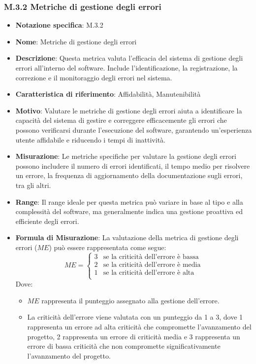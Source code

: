 \subsubsection{M.3.2 Metriche di gestione degli errori}
\begin{itemize}
    \item \textbf{Notazione specifica}: M.3.2
    \item \textbf{Nome}: Metriche di gestione degli errori
    \item \textbf{Descrizione}: Questa metrica valuta l'efficacia del sistema di gestione degli errori all'interno del software. Include l'identificazione, la registrazione, la correzione e il monitoraggio degli errori nel sistema.
    \item \textbf{Caratteristica di riferimento}: Affidabilità, Manutenibilità
    \item \textbf{Motivo}: Valutare le metriche di gestione degli errori aiuta a identificare la capacità del sistema di gestire e correggere efficacemente gli errori che possono verificarsi durante l'esecuzione del software, garantendo un'esperienza utente affidabile e riducendo i tempi di inattività.
    \item \textbf{Misurazione}: Le metriche specifiche per valutare la gestione degli errori possono includere il numero di errori identificati, il tempo medio per risolvere un errore, la frequenza di aggiornamento della documentazione sugli errori, tra gli altri.
    \item \textbf{Range}: Il range ideale per questa metrica può variare in base al tipo e alla complessità del software, ma generalmente indica una gestione proattiva ed efficiente degli errori.
    \item \textbf{Formula di Misurazione}: La valutazione della metrica di gestione degli errori (\( ME \)) può essere rappresentata come segue:
    \[
    ME = \begin{cases} 
          3 & \text{se la criticità dell'errore è bassa} \\
          2 & \text{se la criticità dell'errore è media} \\
          1 & \text{se la criticità dell'errore è alta} \\
       \end{cases}
    \]
    Dove:
    \begin{itemize}
        \item \( ME \) rappresenta il punteggio assegnato alla gestione dell'errore.
        \item La criticità dell'errore viene valutata con un punteggio da 1 a 3, dove 1 rappresenta un errore ad alta criticità che compromette l'avanzamento del progetto, 2 rappresenta un errore di criticità media e 3 rappresenta un errore di bassa criticità che non compromette significativamente l'avanzamento del progetto.

\end{itemize}
\end{itemize}
